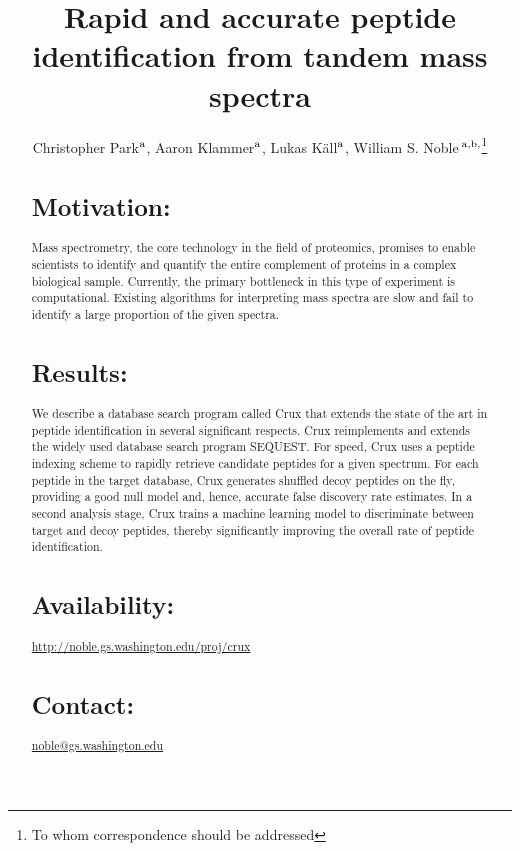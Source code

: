 \documentclass{bioinfo}
\begin{document}

\title[Rapid and accurate peptide identification]{Rapid and accurate
  peptide identification from tandem mass spectra}
\author[Park \textit{et~al}]{Christopher Park$^{\rm a}$, Aaron Klammer$^{\rm a}$,
Lukas K\"{a}ll$^{\rm a}$, 
William S. Noble\,$^{\rm a,b,}$\footnote{To whom correspondence should be addressed}}
\address{
$^{\rm a}$Department of Computer Science and Engineering,
$^{\rm b}$Department of Genome Sciences, University of Washington,
  Seattle, WA, USA
}


\maketitle

\begin{abstract}
\section{Motivation:}  Mass spectrometry, the core technology in the
field of proteomics, promises to enable scientists to identify and
quantify the entire complement of proteins in a complex biological
sample.  Currently, the primary bottleneck in this type of experiment
is computational.  Existing algorithms for interpreting mass spectra
are slow and fail to identify a large proportion of the given spectra.

\section{Results:} We describe a database search program called Crux
that extends the state of the art in peptide identification in several
significant respects.  Crux reimplements and extends the widely used
database search program SEQUEST.  For speed, Crux uses a peptide
indexing scheme to rapidly retrieve candidate peptides for a given
spectrum.  For each peptide in the target database, Crux generates
shuffled decoy peptides on the fly, providing a good null model and,
hence, accurate false discovery rate estimates.  In a second analysis
stage, Crux trains a machine learning model to discriminate between
target and decoy peptides, thereby significantly improving the overall
rate of peptide identification.

\section{Availability:}
\href{http://noble.gs.washington.edu/proj/crux}{http://noble.gs.washington.edu/proj/crux}
\section{Contact:} \href{noble@gs.washington.edu}{noble@gs.washington.edu}
\end{abstract}
\end{document}
